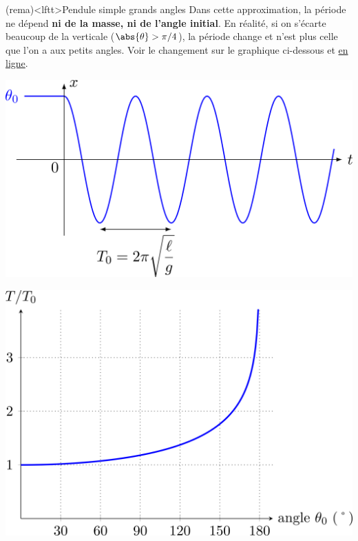 \documentclass[../../main/main.tex]{subfiles}
\begin{document}
\begin{tcb}(rema)<lftt>{Pendule simple grands angles}
	Dans cette approximation, la période ne dépend \textbf{ni de la masse, ni de
		l'angle initial}. En réalité, si on s'écarte beaucoup de la verticale
	($\abs{\theta} > \pi/4$), la période change et n'est plus celle que l'on a aux
	petits angles. Voir le changement sur le graphique ci-dessous et
	\href{http://www.sciences.univ-nantes.fr/sites/genevieve_tulloue/Meca/Oscillateurs/periode_pendule.php}{en ligne}.
	\smallbreak
	\begin{minipage}{0.45\linewidth}
		\begin{center}
			\includegraphics[width=\linewidth]{pendule_sol}
		\end{center}
	\end{minipage}
	\hfill
	\begin{minipage}{0.45\linewidth}
		\begin{center}
			\includegraphics[width=\linewidth]{pendule_gdang}
		\end{center}
	\end{minipage}
	\vspace{-15pt}
\end{tcb}
\end{document}
